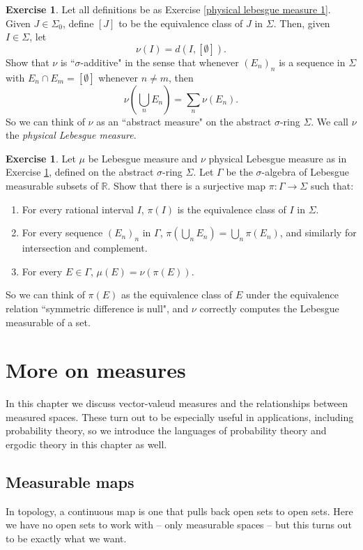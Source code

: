 \documentclass[12pt]{book}
\newcommand{\RR}{\mathbb{R}}
\newcommand{\dfn}[1]{\emph{#1}\index{#1}}
\theoremstyle{definition}
\newtheorem{exercise}[theorem]{Exercise}
\begin{document}
\begin{exercise}
\label{physical lebesgue measure 2}
Let all definitions be as Exercise \ref{physical lebesgue measure 1}.
Given $J \in \Sigma_0$, define $[J]$ to be the equivalence class of $J$ in $\Sigma$.
Then, given $I \in \Sigma$, let
$$\nu(I) = d(I, [\emptyset]).$$
Show that $\nu$ is ``$\sigma$-additive" in the sense that whenever $(E_n)_n$ is a sequence in $\Sigma$ with $E_n \cap E_m = [\emptyset]$ whenever $n \neq m$, then
$$\nu\left(\bigcup_n E_n\right) = \sum_n \nu(E_n).$$
So we can think of $\nu$ as an ``abstract measure" on the abstract $\sigma$-ring $\Sigma$.
We call $\nu$ the \dfn{physical Lebesgue measure}.
\end{exercise}

\begin{exercise}
\label{physical lebesgue measure 3}
Let $\mu$ be Lebesgue measure and $\nu$ physical Lebesgue measure as in Exercise \ref{physical lebesgue measure 2}, defined on the abstract $\sigma$-ring $\Sigma$.
Let $\Gamma$ be the $\sigma$-algebra of Lebesgue measurable subsets of $\RR$. Show that there is a surjective map $\pi: \Gamma \to \Sigma$ such that:
\begin{enumerate}
\item For every rational interval $I$, $\pi(I)$ is the equivalence class of $I$ in $\Sigma$.
\item For every sequence $(E_n)_n$ in $\Gamma$, $\pi(\bigcup_n E_n) = \bigcup_n \pi(E_n)$, and similarly for intersection and complement.
\item For every $E \in \Gamma$, $\mu(E) = \nu(\pi(E))$.
\end{enumerate}
So we can think of $\pi(E)$ as the equivalence class of $E$ under the equivalence relation ``symmetric difference is null", and $\nu$ correctly computes the Lebesgue measurable of a set.
\end{exercise}



\chapter{More on measures}
In this chapter we discuss vector-valeud measures and the relationships between measured spaces.
These turn out to be especially useful in applications, including probability theory, so we introduce the languages of probability theory and ergodic theory in this chapter as well.

\section{Measurable maps}
In topology, a continuous map is one that pulls back open sets to open sets.
Here we have no open sets to work with -- only measurable spaces -- but this turns out to be exactly what we want.
\end{document}
